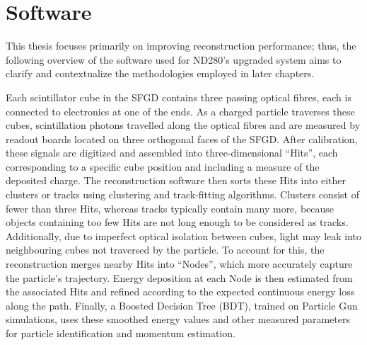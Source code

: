 \section{Software}
\label{sec:t2k-sw}
This thesis focuses primarily on improving reconstruction performance; thus, the following overview of the software used for ND280’s upgraded system aims to clarify and contextualize the methodologies employed in later chapters.

Each scintillator cube in the SFGD contains three passing optical fibres, each is connected to electronics at one of the ends. 
As a charged particle traverses these cubes, scintillation photons travelled along the optical fibres and are measured by readout boards located on three orthogonal faces of the SFGD.  
After calibration, these signals are digitized and assembled into three-dimensional ``Hits'', each corresponding to a specific cube position and including a measure of the deposited charge.  
The reconstruction software then sorts these Hits into either clusters or tracks using clustering and track-fitting algorithms.  
Clusters consist of fewer than three Hits, whereas tracks typically contain many more, because objects containing too few Hits are not long enough to be considered as tracks. 
Additionally, due to imperfect optical isolation between cubes, light may leak into neighbouring cubes not traversed by the particle.  
To account for this, the reconstruction merges nearby Hits into ``Nodes'', which more accurately capture the particle’s trajectory.  
Energy deposition at each Node is then estimated from the associated Hits and refined according to the expected continuous energy loss along the path.  
Finally, a Boosted Decision Tree (BDT), trained on Particle Gun simulations, uses these smoothed energy values and other measured parameters for particle identification and momentum estimation.  
